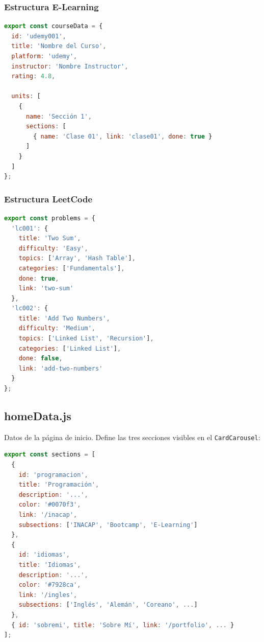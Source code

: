 \documentclass[12pt,a4paper]{article}
\begin{document}
\subsubsection{Estructura E-Learning}

\begin{lstlisting}[language=JavaScript, caption={Patrón de datos E-Learning}]
export const courseData = {
  id: 'udemy001',
  title: 'Nombre del Curso',
  platform: 'udemy',
  instructor: 'Nombre Instructor',
  rating: 4.8,

  units: [
    {
      name: 'Sección 1',
      sections: [
        { name: 'Clase 01', link: 'clase01', done: true }
      ]
    }
  ]
};
\end{lstlisting}

\subsubsection{Estructura LeetCode}

\begin{lstlisting}[language=JavaScript, caption={Estructura problems.js (fragmento)}]
export const problems = {
  'lc001': {
    title: 'Two Sum',
    difficulty: 'Easy',
    topics: ['Array', 'Hash Table'],
    categories: ['Fundamentals'],
    done: true,
    link: 'two-sum'
  },
  'lc002': {
    title: 'Add Two Numbers',
    difficulty: 'Medium',
    topics: ['Linked List', 'Recursion'],
    categories: ['Linked List'],
    done: false,
    link: 'add-two-numbers'
  }
};
\end{lstlisting}

\subsection{homeData.js}

Datos de la página de inicio. Define las tres secciones visibles en el \texttt{CardCarousel}:

\begin{lstlisting}[language=JavaScript]
export const sections = [
  {
    id: 'programacion',
    title: 'Programación',
    description: '...',
    color: '#0070f3',
    link: '/inacap',
    subsections: ['INACAP', 'Bootcamp', 'E-Learning']
  },
  {
    id: 'idiomas',
    title: 'Idiomas',
    description: '...',
    color: '#7928ca',
    link: '/ingles',
    subsections: ['Inglés', 'Alemán', 'Coreano', ...]
  },
  { id: 'sobremi', title: 'Sobre Mí', link: '/portfolio', ... }
];
\end{lstlisting}
\end{document}
